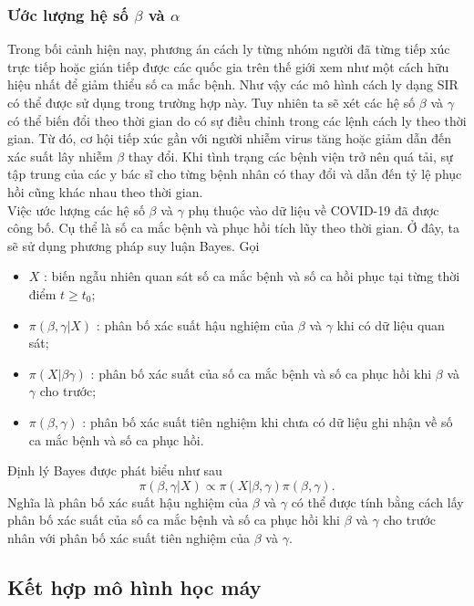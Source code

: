 \documentclass[a4paper]{article}
\begin{document}
\subsubsection{Ước lượng hệ số $\beta$ và $\alpha$}
Trong bối cảnh hiện nay, phương án cách ly từng nhóm người đã từng tiếp xúc trực tiếp hoặc gián tiếp được các quốc gia trên thế giới xem như một cách hữu hiệu nhất để giảm thiểu số ca
mắc bệnh. Như vậy các mô hình cách ly dạng SIR có thể được sử dụng trong trường hợp này.
Tuy nhiên ta sẽ xét các hệ số $\beta$ và $\gamma$ có thể biến đổi theo thời gian do có sự điều chỉnh trong các
lệnh cách ly theo thời gian. Từ đó, cơ hội tiếp xúc gần với người nhiễm virus tăng hoặc giảm dẫn
đến xác suất lây nhiễm $\beta$ thay đổi. Khi tình trạng các bệnh viện trở nên quá tải, sự tập trung
của các y bác sĩ cho từng bệnh nhân có thay đổi và dẫn đến tỷ lệ phục hồi cũng khác nhau theo
thời gian.
\\
Việc ước lượng các hệ số $\beta$ và $\gamma$ phụ thuộc vào dữ liệu về COVID-19 đã được công bố. Cụ thể là số ca mắc bệnh và phục hồi tích lũy theo thời gian. Ở đây, ta sẽ sử dụng phương pháp suy luận Bayes. Gọi
\begin{itemize}
\item $X$ : biến ngẫu nhiên quan sát số ca mắc bệnh và số ca hồi phục tại từng thời điểm $t \geq t_0$;
\item $\pi (\beta , \gamma|X) $ : phân bố xác suất hậu nghiệm của $\beta$ và $\gamma$ khi có dữ liệu quan sát;
\item $\pi (X|\beta \gamma)$ : phân bố xác suất của số ca mắc bệnh và số ca phục hồi khi $\beta$ và $\gamma$ cho trước;
\item $\pi(\beta,\gamma)$ : phân bố xác suất tiên nghiệm khi chưa có dữ liệu ghi nhận về số ca mắc bệnh và
số ca phục hồi.
\end{itemize}
Định lý Bayes được phát biểu như sau
\begin{equation}
\pi (\beta,\gamma|X)\propto \pi (X|\beta,\gamma) \pi (\beta,\gamma).
\end{equation}
Nghĩa là phân bố xác suất hậu nghiệm của $\beta$ và $\gamma$ có thể được tính bằng cách lấy phân bố xác
suất của số ca mắc bệnh và số ca phục hồi khi $\beta$ và $\gamma$ cho trước nhân với phân bố xác suất tiên
nghiệm của $\beta$ và $\gamma$.

\subsection{Kết hợp mô hình học máy}
\end{document}
